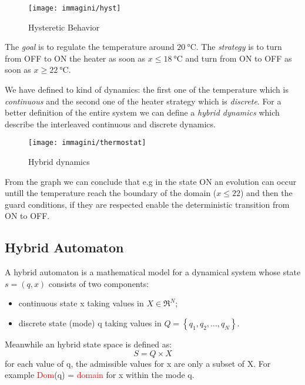 \begin{figure}[h]
	\centering
	\texttt{[image: immagini/hyst]}
	\caption{Hysteretic Behavior}
	\label{fig:hyst}
\end{figure}

The \emph{goal} is to regulate the temperature around $\SI{20}{\celsius}$. The \emph{strategy} is to turn from OFF to ON the heater as soon as $x\le \SI{18}{\celsius}$ and turn from ON to OFF as soon as $x\ge\SI{22}{\celsius}$.

We have defined to kind of dynamics: the first one of the temperature which is \emph{continuous} and the second one of the heater strategy which is \emph{discrete}. For a better definition of the entire system we can define a \emph{hybrid dynamics} which describe the interleaved continuous and discrete dynamics.

\begin{figure}[h]
	\centering
	\texttt{[image: immagini/thermostat]}
	\caption{Hybrid dynamics}
	\label{fig:thermostat}
\end{figure}

From the graph we can conclude that e.g in the state ON an evolution can occur untill the temperature reach the boundary of the domain ($x\le22$) and then the guard conditions, if they are respected enable the deterministic transition from ON to OFF.

\subsection{Hybrid Automaton}
A hybrid automaton is a mathematical model for a dynamical system whose state $s =(q,x)$ consists of two components:
\begin{itemize}
	\item continuous state x taking values in $X\in\Re^N$;
	\item discrete state (mode) q taking values in $Q = \left\{q_1,q_2, \dots,q_N\right\}$.
\end{itemize}
Meanwhile an hybrid state space is defined as:
\[
S=Q\times X 
\]
for each value of q, the admissible values for x are only a subset of X.
For example \textcolor{red}{Dom}(q) = \textcolor{red}{domain} for x within the mode q.

